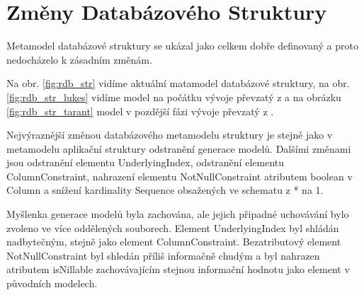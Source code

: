 \documentclass[11pt,twoside,a4paper]{book}
\begin{document}
\FloatBarrier

\section{Změny Databázového Struktury}
 Metamodel databázové struktury se ukázal jako celkem dobře definovaný a proto
 nedocházelo k zásadním změnám.

 Na obr. \ref{fig:rdb_str} vidíme aktuální matamodel databázové struktury, na
 obr. \ref{fig:rdb_str_lukes} vidíme model na počátku vývoje převzatý z
 \cite{Lukes} a na obrázku \ref{fig:rdb_str_tarant} model v pozdější fázi vývoje
 převzatý z \cite{Tarant_bp}.

 Nejvýraznější změnou databázového metamodelu struktury je stejně jako v
 metamodelu aplikační struktury odstranění generace modelů. Dalšími změnami jsou 
 odstranění elementu UnderlyingIndex, odstranění elementu ColumnConstraint,
 nahrazení elementu NotNullConstraint atributem boolean v Column a snížení
 kardinality Sequence obsažených ve schematu z * na 1.
 
 Myšlenka generace modelů byla zachována, ale jejich připadné uchovávání bylo
 zvoleno ve více oddělených souborech. Element UnderlyingIndex byl shládán
 nadbytečným, stejně jako element ColumnConstraint. Bezatributový element
 NotNullConstraint byl shledán příliš informačně chudým a byl nahrazen atributem
 isNillable zachovávajícím stejnou informační hodnotu jako element v původních
 modelech. 
\end{document}
